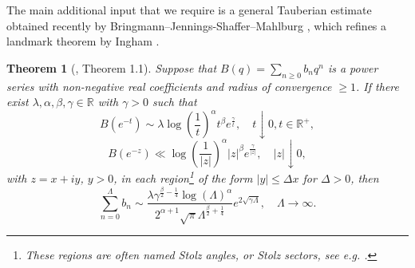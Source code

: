 \documentclass[11pt,a4paper,reqno]{article}
\newtheorem{theorem}{Theorem}[section]
\theoremstyle{definition}
\theoremstyle{remark}
\newcommand\R{\mathbb{R}}
\begin{document}
The main additional input that we require is a general Tauberian estimate obtained recently by Bringmann--Jennings-Shaffer--Mahlburg \cite{BJSM23}, which refines a landmark theorem by Ingham \cite{Ing41}.

\begin{theorem}[\cite{BJSM23}, Theorem 1.1]\label{thm:BJSM}
Suppose that $B(q)=\sum_{n\geq 0}b_n q^n$ is a power series with non-negative real coefficients and radius of convergence $\geq 1$. If there exist $\lambda,\alpha,\beta,\gamma\in\R$ with $\gamma>0$ such that
\begin{equation}
B(e^{-t})\sim \lambda\log\left(\frac1t\right)^\alpha t^\beta e^{\frac{\gamma}{t}},\quad t\downarrow 0, t \in \mathbb R^+,
\end{equation}
\begin{equation}
B(e^{-z})\ll \log\left(\frac{1}{\vert z\vert}\right)^\alpha \vert z\vert^\beta e^{\frac{\gamma}{\vert z\vert}},\quad \vert z\vert\downarrow 0,
\end{equation}
with $z=x+iy$, $y>0$, in each region\footnote{These regions are often named Stolz angles, or Stolz sectors, see e.g. \cite{Dur70}.} of the form $\vert y\vert\leq \Delta x$ for $\Delta>0$, then
\begin{equation}
\sum_{n=0}^\Lambda b_n\sim \frac{\lambda\gamma^{\frac{\beta}{2}-\frac14}\log(\Lambda)^\alpha}{2^{\alpha+1}\sqrt{\pi}\Lambda^{\frac{\beta}{2}+\frac14}}e^{2\sqrt{\gamma \Lambda}},\quad \Lambda\to\infty.
\end{equation}
\end{theorem}
\end{document}
